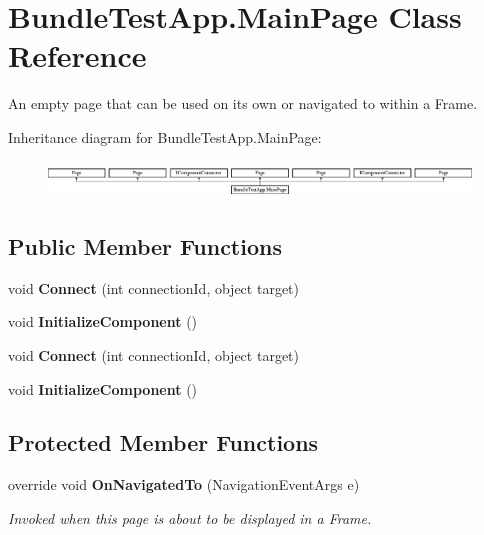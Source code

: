 \section{Bundle\+Test\+App.\+Main\+Page Class Reference}
\label{class_bundle_test_app_1_1_main_page}


An empty page that can be used on its own or navigated to within a Frame.  


Inheritance diagram for Bundle\+Test\+App.\+Main\+Page\+:\begin{figure}[H]
\begin{center}
\leavevmode
\includegraphics[height=0.963855cm]{class_bundle_test_app_1_1_main_page}
\end{center}
\end{figure}
\subsection*{Public Member Functions}
\begin{DoxyCompactItemize}
\item 
void {\bfseries Connect} (int connection\+Id, object target)\label{class_bundle_test_app_1_1_main_page_a1b2894ce672e07a268d1a08b1ccad0ee}

\item 
void {\bfseries Initialize\+Component} ()\label{class_bundle_test_app_1_1_main_page_ae952fc1d1b7431744de6901a59ebdd5f}

\item 
void {\bfseries Connect} (int connection\+Id, object target)\label{class_bundle_test_app_1_1_main_page_a1b2894ce672e07a268d1a08b1ccad0ee}

\item 
void {\bfseries Initialize\+Component} ()\label{class_bundle_test_app_1_1_main_page_ae952fc1d1b7431744de6901a59ebdd5f}

\end{DoxyCompactItemize}
\subsection*{Protected Member Functions}
\begin{DoxyCompactItemize}
\item 
override void {\bf On\+Navigated\+To} (Navigation\+Event\+Args e)
\begin{DoxyCompactList}\small\item\em Invoked when this page is about to be displayed in a Frame. \end{DoxyCompactList}\end{DoxyCompactItemize}


